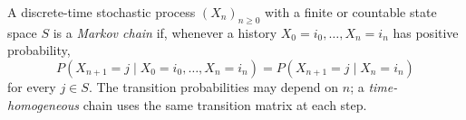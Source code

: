 
A discrete-time stochastic process $(X_n)_{n\ge0}$ with a finite or countable state space $S$ is a \emph{Markov chain} if, whenever a history $X_0=i_0,\ldots,X_n=i_n$ has positive probability,
\[
P(X_{n+1}=j\mid X_0=i_0,\ldots,X_n=i_n)=P(X_{n+1}=j\mid X_n=i_n)
\]
for every $j\in S$. The transition probabilities may depend on $n$; a \emph{time-homogeneous} chain uses the same transition matrix at each step.
